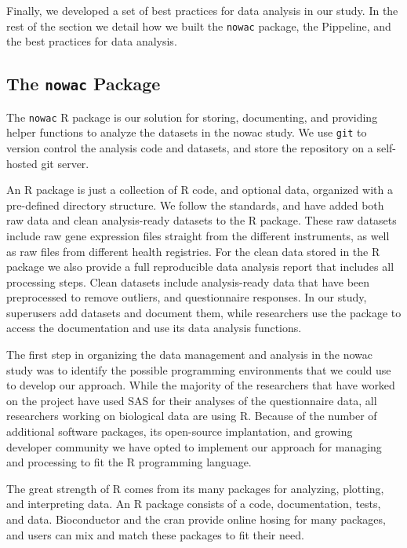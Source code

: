 Finally, we developed a set of best practices for data analysis in our study. In
the rest of the section we detail how we built the \texttt{nowac} package, the
Pippeline, and the best practices for data analysis. 

\subsection{The \texttt{nowac} Package} 
The \texttt{nowac} R package is our solution for storing, documenting, and
providing helper functions to analyze the datasets in the \gls{nowac} study. We
use \texttt{git} to version control the analysis code and datasets, and store
the repository on a self-hosted git server.

An R package is just a collection of R code, and optional data, organized with a
pre-defined directory structure. We follow the standards, and have added both
raw data and clean analysis-ready datasets to the R package. These raw datasets
include raw gene expression files straight from the different instruments, as
well as raw files from different health registries. For the clean data stored in
the R package we also provide a full reproducible data analysis report that
includes all processing steps. Clean datasets include analysis-ready data that
have been preprocessed to remove outliers, and questionnaire responses. In our
study, superusers add datasets and document them, while researchers use the
package to access the documentation and use its data analysis functions.  

The first step in organizing the data management and analysis in the
\gls{nowac} study was to identify the possible programming environments that we
could use to develop our approach. While the majority of the researchers that
have worked on the project have used SAS for their analyses of the questionnaire
data, all researchers working on biological data are using R. Because of the
number of additional software  packages, its open-source implantation, and
growing developer community we have opted to implement our approach for managing
and processing to fit the R programming language. 

The great strength of R comes from its many packages for analyzing, plotting,
and interpreting data. An R package consists of a code, documentation, tests,
and data. Bioconductor\cite{bioconductor} and the \gls{cran}\cite{cran} provide
online hosing for many packages, and users can mix and match these
packages to fit their need. 

